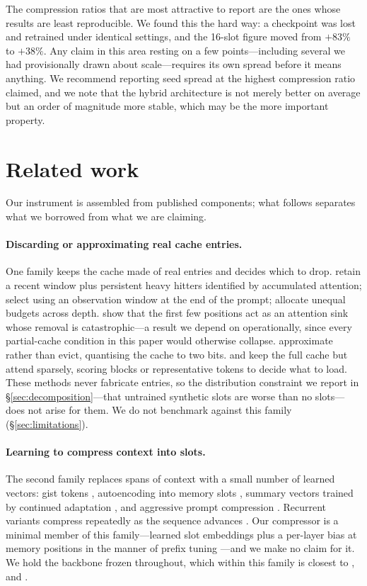 \documentclass[11pt]{article}
\begin{document}
The compression ratios that are most attractive to report are the ones whose
results are least reproducible. We found this the hard way: a checkpoint was
lost and retrained under identical settings, and the 16-slot figure moved from
$+83\%$ to $+38\%$. Any claim in this area resting on a few points---including
several we had provisionally drawn about scale---requires its own spread before
it means anything. We recommend reporting seed spread at the highest compression
ratio claimed, and we note that the hybrid architecture is not merely better on
average but an order of magnitude more stable, which may be the more important
property.

\section{Related work}
\label{sec:related}

Our instrument is assembled from published components; what follows separates
what we borrowed from what we are claiming.

\paragraph{Discarding or approximating real cache entries.}
One family keeps the cache made of real entries and decides which to drop.
\citet{h2o} retain a recent window plus persistent heavy hitters identified by
accumulated attention; \citet{snapkv} select using an observation window at the
end of the prompt; \citet{pyramidkv} allocate unequal budgets across depth.
\citet{streamingllm} show that the first few positions act as an attention sink
whose removal is catastrophic---a result we depend on operationally, since every
partial-cache condition in this paper would otherwise collapse.
\citet{kivi} approximate rather than evict, quantising the cache to two bits.
\citet{quest} and \citet{infllm} keep the full cache but attend sparsely, scoring
blocks or representative tokens to decide what to load. These methods never
fabricate entries, so the distribution constraint we report in
\S\ref{sec:decomposition}---that untrained synthetic slots are worse than no
slots---does not arise for them. We do not benchmark against this family
(\S\ref{sec:limitations}).

\paragraph{Learning to compress context into slots.}
The second family replaces spans of context with a small number of learned
vectors: gist tokens \citep{gist}, autoencoding into memory slots \citep{icae},
summary vectors trained by continued adaptation \citep{autocompressor}, and
aggressive prompt compression \citep{500x}. Recurrent variants compress
repeatedly as the sequence advances \citep{compressive,rmt,lcirc}. Our compressor
is a minimal member of this family---learned slot embeddings plus a per-layer
bias at memory positions in the manner of prefix tuning \citep{ptuningv2}---and we
make no claim for it. We hold the backbone frozen throughout, which within this
family is closest to \citet{icae}, \citet{arcencoder} and \citet{500x}.
\end{document}
